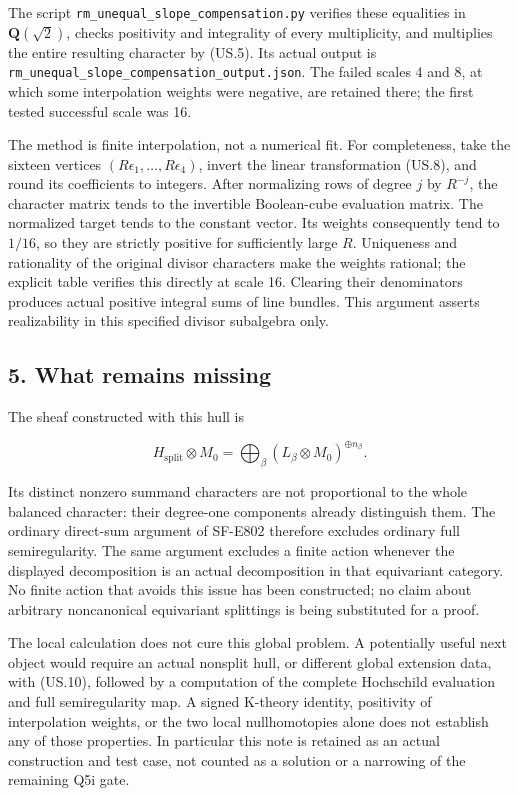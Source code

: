 The script \texttt{rm\_unequal\_slope\_compensation.py} verifies these
equalities in \(\mathbf Q(\sqrt2)\), checks positivity and integrality
of every multiplicity, and multiplies the entire resulting character by
(US.5). Its actual output is
\texttt{rm\_unequal\_slope\_compensation\_output.json}. The failed
scales 4 and 8, at which some interpolation weights were negative, are
retained there; the first tested successful scale was 16.

The method is finite interpolation, not a numerical fit. For
completeness, take the sixteen vertices
\((R\epsilon_1,\ldots,R\epsilon_4)\), invert the linear transformation
(US.8), and round its coefficients to integers. After normalizing rows
of degree \(j\) by \(R^{-j}\), the character matrix tends to the
invertible Boolean-cube evaluation matrix. The normalized target tends
to the constant vector. Its weights consequently tend to \(1/16\), so
they are strictly positive for sufficiently large \(R\). Uniqueness and
rationality of the original divisor characters make the weights
rational; the explicit table verifies this directly at scale 16.
Clearing their denominators produces actual positive integral sums of
line bundles. This argument asserts realizability in this specified
divisor subalgebra only.

\subsection{5. What remains missing}\label{SF-US-what-remains-missing}

The sheaf constructed with this hull is

\[
 H_{\mathrm{split}}\otimes M_0
   =\bigoplus_\beta (L_\beta\otimes M_0)^{\oplus n_\beta}.
\]

Its distinct nonzero summand characters are not proportional to the
whole balanced character: their degree-one components already
distinguish them. The ordinary direct-sum argument of SF-E802 therefore
excludes ordinary full semiregularity. The same argument excludes a
finite action whenever the displayed decomposition is an actual
decomposition in that equivariant category. No finite action that avoids
this issue has been constructed; no claim about arbitrary noncanonical
equivariant splittings is being substituted for a proof.

The local calculation does not cure this global problem. A potentially
useful next object would require an actual nonsplit hull, or different
global extension data, with (US.10), followed by a computation of the
complete Hochschild evaluation and full semiregularity map. A signed
K-theory identity, positivity of interpolation weights, or the two local
nullhomotopies alone does not establish any of those properties. In
particular this note is retained as an actual construction and test
case, not counted as a solution or a narrowing of the remaining Q5i
gate.
